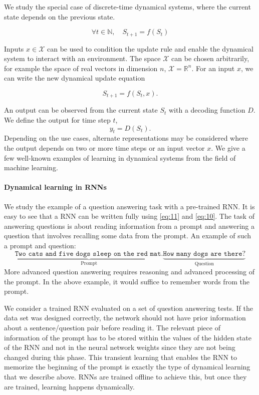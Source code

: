 We study the special case of discrete-time dynamical systems, where the current
state depends on the previous state.

\begin{equation}
  \forall t \in \mathbb{N},\quad S_{t + 1} = f(S_{t})
  \label{eq:dyn-update}
\end{equation}

Inputs $x \in \mathcal{X}$ can be used to condition the update rule and enable the dynamical system
to interact with an environment. The space $\mathcal{X}$ can be chosen arbitrarily, for example the space of real vectors in dimension $n$, $\mathcal{X} = \mathbb{R}^n$. For an input $x$, we can write the new dynamical update equation

\begin{equation}
S_{t+1} = f(S_t, x).
\label{eq:11}
\end{equation}

An output can be observed from the current state $S_t$ with a decoding function
$D$. We define the output for time step $t$,
\begin{equation}
  \label{eq:10}
  y_t = D(S_t).
\end{equation}
Depending on the use cases, alternate representations may be considered where
the output depends on two or more time steps or an input vector $x$.
We give a few well-known examples of learning in dynamical systems from the
field of machine learning.

\paragraph{Dynamical learning in \acp{RNN}}\label{sec:dynam-learn-acprnn}
We study the example of a question answering task with a pre-trained \ac{RNN}.
It is easy to see that a \ac{RNN} can be written fully using \eqref{eq:11} and
\eqref{eq:10}. The task of answering questions is about reading information from
a prompt and answering a question that involves recalling some data from the
prompt. An example of such a prompt and question:
\begin{equation*}
  \underbrace{\texttt{Two cats and five dogs sleep on the red mat.}}_{\text{Prompt}}
  \underbrace{\texttt{How many dogs are there?}}_{\text{Question}}
\end{equation*}
More advanced question answering requires reasoning and advanced processing of
the prompt. In the above example, it would suffice to remember words from the
prompt.

We consider a trained \ac{RNN} evaluated on a set of question answering tests.
If the data set was designed correctly, the network should not have prior
information about a sentence/question pair before reading it. The relevant piece
of information of the prompt has to be stored within the values of the hidden
state of the \ac{RNN} and not in the neural network weights since they are not
being changed during this phase. This transient learning that enables the
\ac{RNN} to memorize the beginning of the prompt is exactly the type of
dynamical learning that we describe above. \acp{RNN} are trained offline to
achieve this, but once they are trained, learning happens dynamically.

